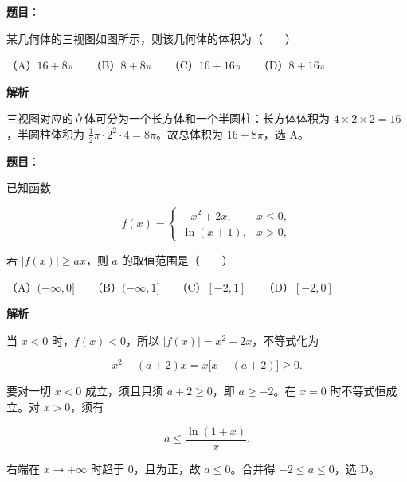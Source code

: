 \begin{answer}

\textbf{题目}：

某几何体的三视图如图所示，则该几何体的体积为\mbox{（　　）}
\nopagebreak[4]
\begin{center}\end{center}
\nopagebreak[4]
（A）$16+8\pi$　　（B）$8+8\pi$　　（C）$16+16\pi$　　（D）$8+16\pi$

\textbf{解析}

三视图对应的立体可分为一个长方体和一个半圆柱：长方体体积为 $4\times2\times2=16$，半圆柱体积为 $\tfrac12\pi\cdot2^2\cdot4=8\pi$。故总体积为 $16+8\pi$，选 A。


\end{answer}
\begin{answer}

\textbf{题目}：

已知函数

\nopagebreak[4]
\[
f(x)=\begin{cases}
-x^2+2x,&x\leqslant0,\\
\ln(x+1),&x>0,
\end{cases}
\]

若 $|f(x)|\geqslant ax$，则 $a$ 的取值范围是\mbox{（　　）}

（A）$(-\infty,0]$　　（B）$(-\infty,1]$　　（C）$[-2,1]$　　（D）$[-2,0]$

\textbf{解析}

当 $x<0$ 时，$f(x)<0$，所以 $|f(x)|=x^2-2x$，不等式化为

\nopagebreak[4]
\[
x^2-(a+2)x=x\bigl[x-(a+2)\bigr]\geqslant0.
\]

要对一切 $x<0$ 成立，须且只须 $a+2\geqslant0$，即 $a\geqslant-2$。在 $x=0$ 时不等式恒成立。对 $x>0$，须有

\nopagebreak[4]
\[
a\leqslant\frac{\ln(1+x)}x.
\]

右端在 $x\to+\infty$ 时趋于 $0$，且为正，故 $a\leqslant0$。合并得 $-2\leqslant a\leqslant0$，选 D。


\end{answer}

